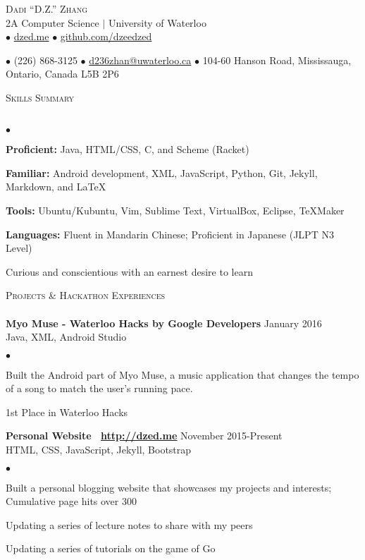 \documentclass{article}
\newcommand{\lineunder}{\vspace*{-8pt} \\ \hspace*{-18pt} \hrulefill \\}
\newcommand{\header}[1]{{\hspace*{-15pt}\vspace*{6pt} \textsc{#1}} \vspace*{-6pt} \lineunder}
\newcommand{\employer}[3]{{ \textbf{#1} \hfill #2\\ {#3}\\  }}
\newcommand{\contact}[3]{
\begin{center}
{}
\end{center}
\vspace*{-8pt}
\begin{center}
{\LARGE \scshape {#1}}\\
#2\\
#3
\end{center}
\vspace*{-8pt}
}
\newenvironment{achievements}{\begin{list}{$\bullet$}{\topsep 0pt \itemsep -2pt}}{\vspace*{4pt}\end{list}}
\begin{document}
\small
\smallskip
\vspace*{-44pt}

\contact{Dadi ``D.Z.'' Zhang}
{2A Computer Science $\vert$ University of Waterloo}
{$\bullet$ \href{http://dzed.me}{dzed.me}
$\bullet$ \href{http://github.com/dzeedzed}{github.com/dzeedzed}}
{$\bullet$ (226) 868-3125
$\bullet$ \href{mailto:d236zhan@uwaterloo.ca}{d236zhan@uwaterloo.ca}
$\bullet$ 104-60 Hanson Road, Mississauga, Ontario, Canada L5B 2P6}

\hfill \break
\header{Skills Summary}
\begin{achievements}
\item \textbf{Proficient:} Java, HTML/CSS, C, and Scheme (Racket)
\item \textbf{Familiar:} Android development, XML, JavaScript, Python, Git, Jekyll, Markdown, and  \LaTeX\
\item \textbf{Tools:} Ubuntu/Kubuntu, Vim, Sublime Text, VirtualBox, Eclipse, TeXMaker
\item \textbf{Languages:} Fluent in Mandarin Chinese; Proficient in Japanese (JLPT N3 Level)
\item Curious and conscientious with an earnest desire to learn 
\end{achievements}

\header{Projects \& Hackathon Experiences}

\employer{Myo Muse - Waterloo Hacks by Google Developers}{January 2016}{Java, XML, Android Studio}
	\begin{achievements}
	\item Built the Android part of Myo Muse, a music application that changes the tempo of a song to match the user's running pace.
	\item 1st Place in Waterloo Hacks
	\end{achievements}
	
\employer{Personal Website \hspace{5pt} \Mundus~\href{http://dzed.me}{\underline{http://dzed.me}}}{November 2015-Present}{HTML, CSS, JavaScript, Jekyll, Bootstrap}
	\begin{achievements}
	\item Built a personal blogging website that showcases my projects and interests; Cumulative page hits over 300
	\item Updating a series of lecture notes to share with my peers
	\item Updating a series of tutorials on the game of Go
	\end{achievements}
	
\end{document}
